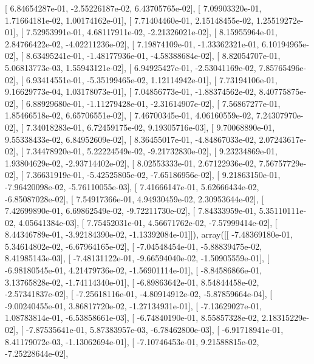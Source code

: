 \documentclass{article}
\begin{document}
       [  6.84654287e-01,  -2.55226187e-02,   6.43705765e-02],
       [  7.09903320e-01,   1.71664181e-02,   1.00174162e-01],
       [  7.71404460e-01,   2.15148455e-02,   1.25519272e-01],
       [  7.52953991e-01,   4.68117911e-02,  -2.21326021e-02],
       [  8.15955964e-01,   2.84766422e-02,  -4.02211236e-02],
       [  7.19874109e-01,  -1.33362321e-01,   6.10194965e-02],
       [  8.63495241e-01,  -1.48177936e-01,  -4.58388684e-02],
       [  8.82054707e-01,   5.06813773e-03,   1.55943121e-02],
       [  6.94925427e-01,  -2.53041169e-02,   7.85765496e-02],
       [  6.93414551e-01,  -5.35199465e-02,   1.12114942e-01],
       [  7.73194106e-01,   9.16629773e-04,   1.03178073e-01],
       [  7.04856773e-01,  -1.88374562e-02,   8.40775875e-02],
       [  6.88929680e-01,  -1.11279428e-01,  -2.31614907e-02],
       [  7.56867277e-01,   1.85466518e-02,   6.65706551e-02],
       [  7.46700345e-01,   4.06160559e-02,   7.24307970e-02],
       [  7.34018283e-01,   6.72459175e-02,   9.19305716e-03],
       [  9.70068890e-01,   9.55338433e-02,   6.84952609e-02],
       [  8.36455017e-01,  -4.84867033e-02,   2.07243617e-02],
       [  7.34478920e-01,   5.22224549e-02,  -9.21732830e-02],
       [  9.23234869e-01,   1.93804629e-02,  -2.93714402e-02],
       [  8.02553333e-01,   2.67122936e-02,   7.56757729e-02],
       [  7.36631919e-01,  -5.42525805e-02,  -7.65186956e-02],
       [  9.21863150e-01,  -7.96420098e-02,  -5.76110055e-03],
       [  7.41666147e-01,   5.62666434e-02,  -6.85087028e-02],
       [  7.54917366e-01,   4.94930459e-02,   2.30953644e-02],
       [  7.42699890e-01,   6.69862549e-02,  -9.72211730e-02],
       [  7.84333959e-01,   5.35110111e-02,   4.05641384e-03],
       [  7.75452031e-01,   4.56671762e-02,  -7.57999414e-02],
       [  8.44346789e-01,  -3.92184390e-02,  -1.13392084e-01]]), array([[ -7.48369180e-01,   5.34614802e-02,  -6.67964165e-02],
       [ -7.04548454e-01,  -5.88839475e-02,   8.41985143e-03],
       [ -7.48131122e-01,  -9.66594040e-02,  -1.50905559e-01],
       [ -6.98180545e-01,   4.21479736e-02,  -1.56901114e-01],
       [ -8.84586866e-01,   3.13765828e-02,  -1.74114340e-01],
       [ -6.89863642e-01,   8.54844458e-02,  -2.57341837e-02],
       [ -7.25618116e-01,  -4.80914912e-02,  -5.87859664e-04],
       [ -9.00240455e-01,   3.86817720e-02,  -1.27134931e-01],
       [ -7.13629027e-01,   1.08783814e-01,  -6.53858661e-03],
       [ -6.74840190e-01,   8.55857328e-02,   2.18315229e-02],
       [ -7.87535641e-01,   5.87383957e-03,  -6.78462800e-03],
       [ -6.91718941e-01,   8.41179072e-03,  -1.13062694e-01],
       [ -7.10746453e-01,   9.21588815e-02,  -7.25228644e-02],
\end{document}
